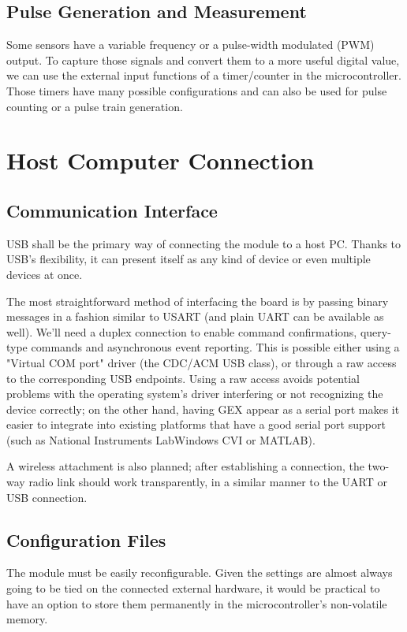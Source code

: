 \subsection{Pulse Generation and Measurement}

Some sensors have a variable frequency or a pulse-width modulated (PWM) output. To capture those signals and convert them to a more useful digital value, we can use the external input functions of a timer/counter in the microcontroller. Those timers have many possible configurations and can also be used for pulse counting or a pulse train generation.

\section{Host Computer Connection}

\subsection{Communication Interface}

USB shall be the primary way of connecting the module to a host PC. Thanks to USB's flexibility, it can present itself as any kind of device or even multiple devices at once.

The most straightforward method of interfacing the board is by passing binary messages in a fashion similar to USART (and plain UART can be available as well). We'll need a duplex connection to enable command confirmations, query-type commands and asynchronous event reporting. This is possible either using a "Virtual COM port" driver (the CDC/ACM USB class), or through a raw access to the corresponding USB endpoints. Using a raw access avoids potential problems with the operating system's driver interfering or not recognizing the device correctly; on the other hand, having GEX appear as a serial port makes it easier to integrate into existing platforms that have a good serial port support (such as National Instruments LabWindows CVI or MATLAB).

A wireless attachment is also planned; after establishing a connection, the two-way radio link should work transparently, in a similar manner to the UART or USB connection.

\subsection{Configuration Files}

The module must be easily reconfigurable. Given the settings are almost always going to be tied on the connected external hardware, it would be practical to have an option to store them permanently in the microcontroller's non-volatile memory.

